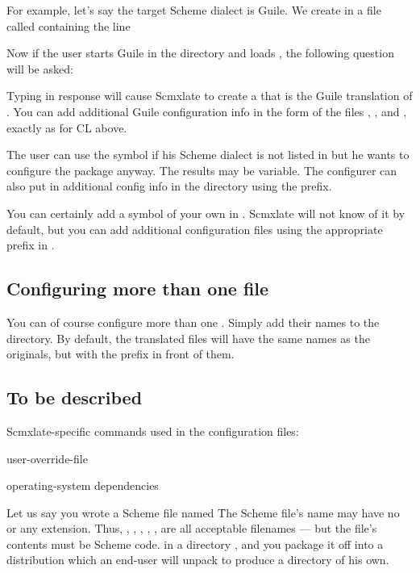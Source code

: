 For example, let's say the target Scheme dialect
is Guile.  We create in  a file called
 containing the line


Now if the user starts Guile in the 
directory and loads , the following
question will be asked:


Typing  in response will cause Scmxlate to
create a  that is the Guile translation
of .  You can add additional Guile
configuration info in the form of the files
, ,
and , exactly as for CL
above.

The user can use the symbol  if his Scheme
dialect is not listed in  but
he wants to configure the package anyway.  The results
may be variable.  The configurer can also put in
additional config info in the 
directory using the  prefix.

You can certainly add a symbol of your own in
.  Scmxlate will not know
of it by default, but you can add additional
configuration files using the appropriate prefix in
.

\subsection{Configuring more than one file}

You can of course configure more than one .
Simply add their names to the
 directory.  By
default, the translated files will have the same names
as the originals, but with the prefix  in front
of them.

\subsection{To be described}

Scmxlate-specific commands used in the
configuration files:

user-override-file

operating-system dependencies

Let us say you wrote a Scheme file named
\f{The Scheme file's name may have no or
any extension.  Thus, ,
, ,
, ,
 are all acceptable filenames
--- but the file's contents must be Scheme code.} in a
directory , and you package it off into a
distribution which an end-user will unpack to
produce a directory  of his own.
